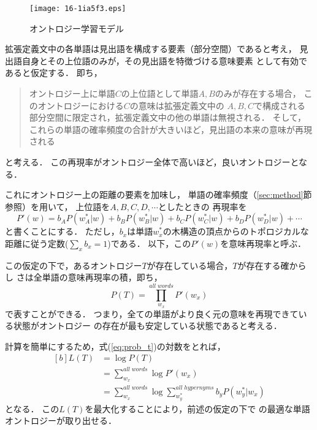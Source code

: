 \documentclass[japanese]{jnlp_1.4}
\begin{document}
\begin{figure}[b]
\vspace{-0.5\baselineskip}
\begin{center}
\texttt{[image: 16-1ia5f3.eps]}
\end{center}
\caption{オントロジー学習モデル}
\label{fig:ont-model}
\end{figure}

拡張定義文中の各単語は見出語を構成する要素（部分空間）であると考え，
見出語自身とその上位語のみが，その見出語を特徴づける意味要素
として有効であると仮定する．
即ち，
\begin{quote}
オントロジー上に単語$C$の上位語として単語$A,B$のみが存在する場合，
このオントロジーにおける$C$の意味は拡張定義文中の
$A,B,C$で構成される部分空間に限定され，拡張定義文中の他の単語は無視される．
そして，これらの単語の確率頻度の合計が大きいほど，見出語の本来の意味が再現される
\end{quote}
と考える．
この再現率がオントロジー全体で高いほど，良いオントロジーとなる．


これにオントロジー上の距離の要素を加味し，
単語の確率頻度（\ref{sec:method}節参照）を用いて，
上位語を$A,B,C,D,\cdots$としたときの
再現率を
\begin{equation}
 P'(w)=b_AP(w_A^*|w)+b_BP(w_B^*|w)+b_CP(w_C^*|w)+b_DP(w_D^*|w)+\cdots
\end{equation}
と書くことにする．
ただし，$b_x$は単語$w_x^*$の木構造の頂点からのトポロジカルな距離に従う定数($\sum_xb_x=1$)である．
以下，この$P'(w)$を意味再現率と呼ぶ．

この仮定の下で，あるオントロジー$T$が存在している場合，$T$が存在する確からし
さは全単語の意味再現率の積，即ち，
\begin{equation}
\label{eq:prob_t}
 P(T)=\prod_{w_x}^{all\; words} P'(w_x)
\end{equation}
で表すことができる．
\pagebreak
つまり，全ての単語がより良く元の意味を再現できている状態がオントロジー
の存在が最も安定している状態であると考える．

計算を簡単にするため，式(\ref{eq:prob_t})の対数をとれば，
\begin{equation}
\begin{aligned}[b]
 L(T) & = \log P(T)\\
  & = \sum_{w_x}^{all\; words}\log P'(w_x) \\
  & = \sum_{w_x}^{all\; words}\log \sum_{w_y^*}^{all\; hypernyms}b_y P(w_y^*|w_x)
\end{aligned}
\end{equation}
となる．
この$L(T)$を最大化することにより，前述の仮定の下で
の最適な単語オントロジーが取り出せる． 
\end{document}
